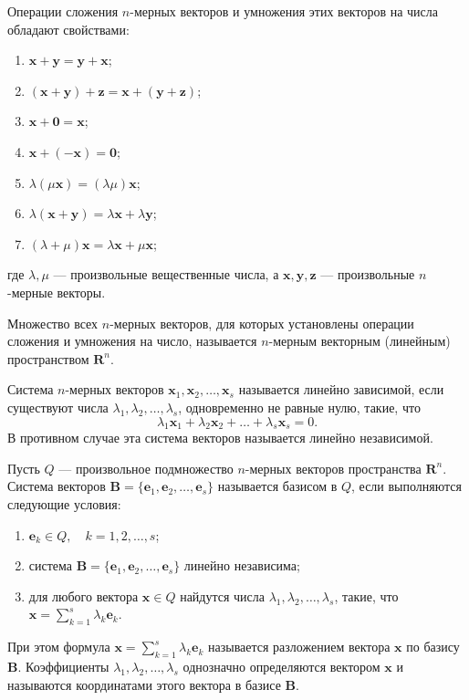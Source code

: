 \documentclass[10pt]{article}
\numberwithin{primer}{section}
\numberwithin{equation}{section}
\begin{document}
Операции сложения $n$-мерных векторов и умножения этих векторов на числа обладают свойствами:
\begin{enumerate}
	\item $\mathbf{x}+\mathbf{y}=\mathbf{y}+\mathbf{x}$;
	\item $\left(\mathbf{x}+\mathbf{y}\right)+\mathbf{z}=\mathbf{x}+\left(\mathbf{y}+\mathbf{z}\right)$;
	\item $\mathbf{x}+\mathbf{0}=\mathbf{x}$;
	\item $\mathbf{x}+\left(-\mathbf{x}\right)=\mathbf{0}$;
	\item $\lambda\left(\mu\mathbf{x}\right)=\left(\lambda\mu\right)\mathbf{x}$;
	\item $\lambda\left(\mathbf{x}+\mathbf{y}\right)=\lambda\mathbf{x}+\lambda\mathbf{y}$;
	\item $\left(\lambda+\mu\right)\mathbf{x}=\lambda\mathbf{x}+\mu\mathbf{x}$;
\end{enumerate}
где $\lambda,\mu$ --- произвольные вещественные числа, а $\mathbf{x},\mathbf{y},\mathbf{z}$ --- произвольные $n$-мерные векторы.

Множество всех $n$-мерных векторов, для которых установлены операции сложения и умножения на число, называется $n$-мерным векторным (линейным) пространством $\mathbf{R}^n$.

Система $n$-мерных векторов $\mathbf{x}_1,\mathbf{x}_2,\ldots,\mathbf{x}_s$ называется линейно зависимой, если существуют числа $\lambda_1,\lambda_2,\ldots,\lambda_s$, одновременно не равные нулю, такие, что
\[
\lambda_1\mathbf{x}_1+\lambda_2\mathbf{x}_2+\ldots+\lambda_s\mathbf{x}_s=0.
\]
В противном случае эта система векторов называется линейно независимой.

Пусть $Q$ --- произвольное подмножество $n$-мерных векторов пространства $\mathbf{R}^n$. Система векторов $\mathbf{B}=\{\mathbf{e}_1,\mathbf{e}_2,\ldots,\mathbf{e}_s\}$ называется базисом в $Q$, если выполняются следующие условия:
\begin{enumerate}
	\item $\mathbf{e}_k\in Q,\quad k=1,2,\ldots,s$;
	\item система $\mathbf{B}=\{\mathbf{e}_1,\mathbf{e}_2,\ldots,\mathbf{e}_s\}$ линейно независима;
	\item для любого вектора $\mathbf{x}\in Q$ найдутся числа $\lambda_1,\lambda_2,\ldots,\lambda_s$, такие, что $\mathbf{x}=\sum_{k=1}^s\lambda_k\mathbf{e}_k$.
\end{enumerate}
При этом формула $\mathbf{x}=\sum_{k=1}^s\lambda_k\mathbf{e}_k$ называется разложением вектора $\mathbf{x}$ по базису $\mathbf{B}$. Коэффициенты $\lambda_1,\lambda_2,\ldots,\lambda_s$ однозначно определяются вектором $\mathbf{x}$ и называются координатами этого вектора в базисе $\mathbf{B}$.
\end{document}

